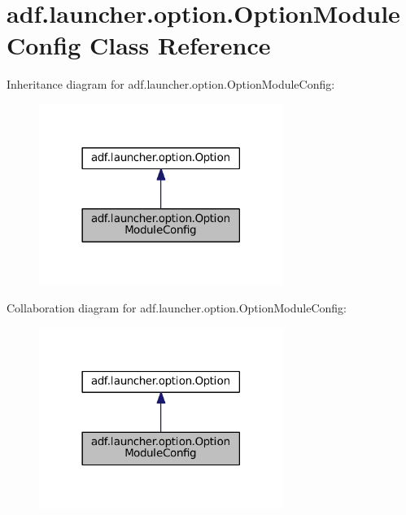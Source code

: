 \hypertarget{classadf_1_1launcher_1_1option_1_1OptionModuleConfig}{}\section{adf.\+launcher.\+option.\+Option\+Module\+Config Class Reference}
\label{classadf_1_1launcher_1_1option_1_1OptionModuleConfig}


Inheritance diagram for adf.\+launcher.\+option.\+Option\+Module\+Config\+:
\nopagebreak
\begin{figure}[H]
\begin{center}
\leavevmode
\includegraphics[width=225pt]{classadf_1_1launcher_1_1option_1_1OptionModuleConfig__inherit__graph}
\end{center}
\end{figure}


Collaboration diagram for adf.\+launcher.\+option.\+Option\+Module\+Config\+:
\nopagebreak
\begin{figure}[H]
\begin{center}
\leavevmode
\includegraphics[width=225pt]{classadf_1_1launcher_1_1option_1_1OptionModuleConfig__coll__graph}
\end{center}
\end{figure}
